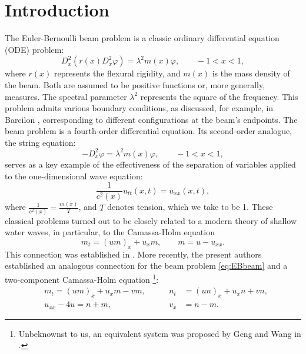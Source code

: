 \documentclass[10pt,a4paper]{article}
\numberwithin{equation}{section}
\theoremstyle{plain}
\theoremstyle{definition}
\begin{document}
\section{Introduction} 
The Euler-Bernoulli beam problem is a classic ordinary differential equation (ODE) problem:
\begin{equation}\label{eq:EBbeam}
D_x^2(r(x) D_x^2 \varphi)=\lambda^2 m(x) \varphi, \qquad -1<x<1,
\end{equation}
where $r(x)$ represents the flexural rigidity, and $m(x)$ is the mass density of the beam. Both are assumed to be positive functions or, more generally, measures. The spectral parameter $\lambda^2$ represents the square of the frequency. This problem admits various boundary conditions, as discussed, for example, in Barcilon \cite{barcilon-beam-royal}, corresponding to different configurations at the beam's endpoints. The beam problem is a fourth-order differential equation. Its second-order analogue, the string equation:
\begin{equation} \label{eq:string}
-D_x^2\varphi=\lambda^2 m(x) \varphi, \qquad -1<x<1,
\end{equation}
serves as a key example of the effectiveness of the separation of variables applied to the one-dimensional wave equation:
\begin{equation}
\frac{1}{c^2(x)}u_{tt}(x,t)=u_{xx}(x,t),
\end{equation}
where $\frac{1}{c^2(x)}=\frac{m(x)}{T}$, and $T$ denotes tension, which we take to be 1.  
These classical problems turned out to be closely related to a modern theory of shallow water waves, 
in particular, to the Camassa-Holm equation \cite{camassa-holm}
\begin{equation} 
m_t=(um)_x+u_xm, \qquad m=u-u_{xx}. 
\end{equation}
This connection was established in \cite{beals-sattinger-szmigielski:stieltjes}.  More recently, the present authors \cite{beals-szmigielski:2021p:2CH-euler-bernoulli-beam-noncommutative-continued-fractions} established an analogous connection for the beam problem \eqref{eq:EBbeam} and 
a two-component Camassa-Holm equation \footnote{{\color{blue} Unbeknownst to us, an equivalent system was proposed by Geng and Wang in \cite{geng-wang:Coupled-CH}}.}: 
\begin{align} 
&m_t=(um)_x+u_x m-vm, \qquad &n_t&=(un)_x+u_x n+vn, \label{eq:2CH}\\
&u_{xx}-4u=n+m,  \qquad &v_x&=n-m. \label{eq:2CHconstraints}
\end{align} 
\end{document}
